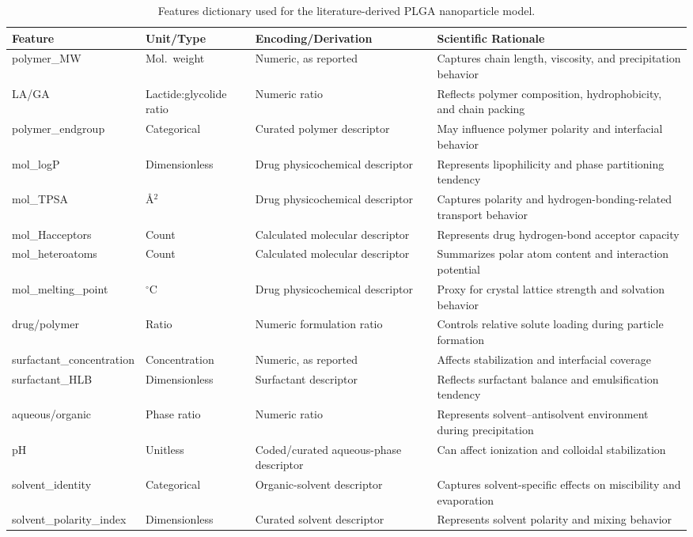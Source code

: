 \documentclass[10pt]{NSP1}
\begin{document}
\begin{table}
\caption{Features dictionary used for the literature-derived PLGA nanoparticle model.}
\label{tab2}
\centering
\small
\begin{tabular}{p{2.8cm}p{2.2cm}p{3.2cm}p{4.5cm}}
\toprule
\textbf{Feature} & \textbf{Unit/Type} & \textbf{Encoding/Derivation} & \textbf{Scientific Rationale}\\
\midrule
polymer\_MW & Mol.\ weight & Numeric, as reported & Captures chain length, viscosity, and precipitation behavior\\
LA/GA & Lactide:glycolide ratio & Numeric ratio & Reflects polymer composition, hydrophobicity, and chain packing\\
polymer\_endgroup & Categorical & Curated polymer descriptor & May influence polymer polarity and interfacial behavior\\
mol\_logP & Dimensionless & Drug physicochemical descriptor & Represents lipophilicity and phase partitioning tendency\\
mol\_TPSA & \AA$^2$ & Drug physicochemical descriptor & Captures polarity and hydrogen-bonding-related transport behavior\\
mol\_Hacceptors & Count & Calculated molecular descriptor & Represents drug hydrogen-bond acceptor capacity\\
mol\_heteroatoms & Count & Calculated molecular descriptor & Summarizes polar atom content and interaction potential\\
mol\_melting\_point & $^\circ$C & Drug physicochemical descriptor & Proxy for crystal lattice strength and solvation behavior\\
drug/polymer & Ratio & Numeric formulation ratio & Controls relative solute loading during particle formation\\
surfactant\_concentration & Concentration & Numeric, as reported & Affects stabilization and interfacial coverage\\
surfactant\_HLB & Dimensionless & Surfactant descriptor & Reflects surfactant balance and emulsification tendency\\
aqueous/organic & Phase ratio & Numeric ratio & Represents solvent--antisolvent environment during precipitation\\
pH & Unitless & Coded/curated aqueous-phase descriptor & Can affect ionization and colloidal stabilization\\
solvent\_identity & Categorical & Organic-solvent descriptor & Captures solvent-specific effects on miscibility and evaporation\\
solvent\_polarity\_index & Dimensionless & Curated solvent descriptor & Represents solvent polarity and mixing behavior\\
\bottomrule
\end{tabular}
\end{table}
\end{document}
